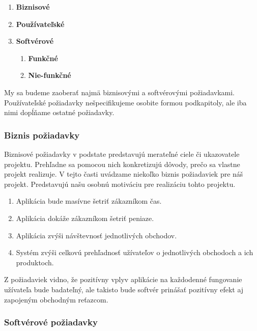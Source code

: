\documentclass[twoside,slovak, a4paper]{article}
\begin{document}
\begin{enumerate}
    \setlength{\itemsep}{4pt}
    \setlength{\parskip}{1pt}
    
    \item \textbf{Biznisové}
    \item \textbf{Používateľské}
    \item \textbf{Softvérové}
    \begin{enumerate}
        \item \textbf{Funkčné}
        \item \textbf{Nie-funkčné}
    \end{enumerate}
\end{enumerate}

My sa budeme zaoberať najmä biznisovými a softvérovými požiadavkami. Používateľské požiadavky nešpecifikujeme osobite formou podkapitoly, ale iba nimi dopĺňame ostatné požiadavky.

\subsubsection{Biznis požiadavky}

Biznisové požiadavky v podstate predstavujú merateľné ciele či ukazovatele projektu. Prehľadne sa pomocou nich konkretizujú dôvody, prečo sa vlastne projekt realizuje.\cite{SB:TSR} V tejto časti uvádzame niekoľko biznis požiadaviek pre náš projekt. Predstavujú našu osobnú motiváciu pre realizáciu tohto projektu.

\begin{enumerate}
    \item Aplikácia bude masívne šetriť zákazníkom čas.
    \item Aplikácia dokáže zákazníkom šetriť peniaze.
    \item Aplikácia zvýši návštevnosť jednotlivých obchodov.
    \item Systém zvýši celkovú prehľadnosť užívateľov o jednotlivých obchodoch a ich produktoch.
\end{enumerate}

Z požiadaviek vidno, že  pozitívny vplyv aplikácie na každodenné fungovanie užívateľa bude badateľný, ale takisto bude softvér prinášať pozitívny efekt aj zapojeným obchodným reťazcom.

\subsubsection{Softvérové požiadavky}
\end{document}
